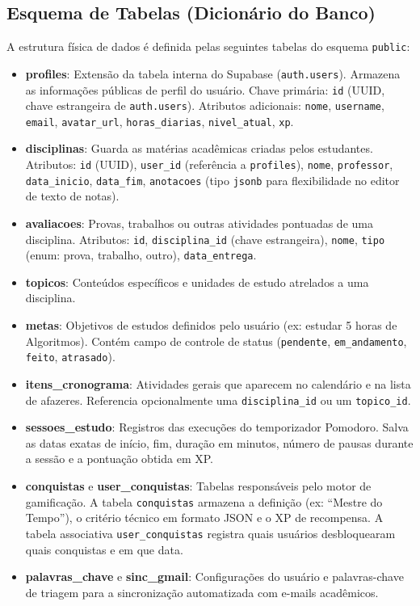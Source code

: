 \documentclass[12pt,a4paper]{article}
\begin{document}
\subsection{Esquema de Tabelas (Dicionário do Banco)}
A estrutura física de dados é definida pelas seguintes tabelas do esquema \texttt{public}:
\begin{itemize}
    \item \textbf{profiles}: Extensão da tabela interna do Supabase (\texttt{auth.users}). Armazena as informações públicas de perfil do usuário. Chave primária: \texttt{id} (UUID, chave estrangeira de \texttt{auth.users}). Atributos adicionais: \texttt{nome}, \texttt{username}, \texttt{email}, \texttt{avatar\_url}, \texttt{horas\_diarias}, \texttt{nivel\_atual}, \texttt{xp}.
    \item \textbf{disciplinas}: Guarda as matérias acadêmicas criadas pelos estudantes. Atributos: \texttt{id} (UUID), \texttt{user\_id} (referência a \texttt{profiles}), \texttt{nome}, \texttt{professor}, \texttt{data\_inicio}, \texttt{data\_fim}, \texttt{anotacoes} (tipo \texttt{jsonb} para flexibilidade no editor de texto de notas).
    \item \textbf{avaliacoes}: Provas, trabalhos ou outras atividades pontuadas de uma disciplina. Atributos: \texttt{id}, \texttt{disciplina\_id} (chave estrangeira), \texttt{nome}, \texttt{tipo} (enum: prova, trabalho, outro), \texttt{data\_entrega}.
    \item \textbf{topicos}: Conteúdos específicos e unidades de estudo atrelados a uma disciplina.
    \item \textbf{metas}: Objetivos de estudos definidos pelo usuário (ex: estudar 5 horas de Algoritmos). Contém campo de controle de status (\texttt{pendente}, \texttt{em\_andamento}, \texttt{feito}, \texttt{atrasado}).
    \item \textbf{itens\_cronograma}: Atividades gerais que aparecem no calendário e na lista de afazeres. Referencia opcionalmente uma \texttt{disciplina\_id} ou um \texttt{topico\_id}.
    \item \textbf{sessoes\_estudo}: Registros das execuções do temporizador Pomodoro. Salva as datas exatas de início, fim, duração em minutos, número de pausas durante a sessão e a pontuação obtida em XP.
    \item \textbf{conquistas} e \textbf{user\_conquistas}: Tabelas responsáveis pelo motor de gamificação. A tabela \texttt{conquistas} armazena a definição (ex: ``Mestre do Tempo''), o critério técnico em formato JSON e o XP de recompensa. A tabela associativa \texttt{user\_conquistas} registra quais usuários desbloquearam quais conquistas e em que data.
    \item \textbf{palavras\_chave} e \textbf{sinc\_gmail}: Configurações do usuário e palavras-chave de triagem para a sincronização automatizada com e-mails acadêmicos.
\end{itemize}
\end{document}
